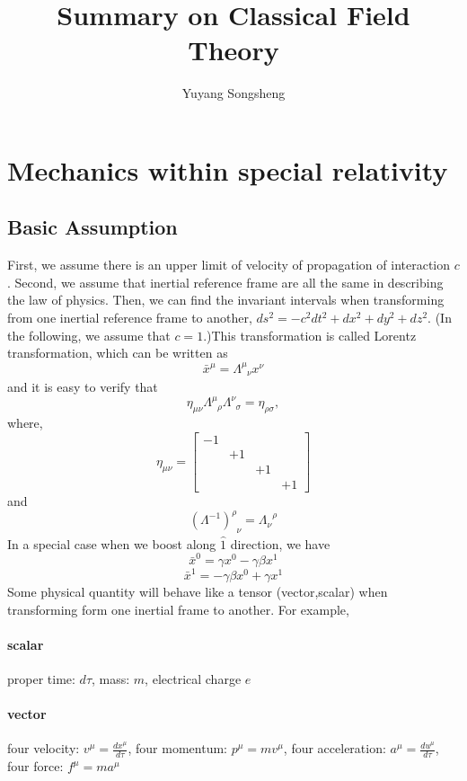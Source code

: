 \documentclass{article}
\author{Yuyang Songsheng}
\title{Summary on Classical Field Theory}
\begin{document}
\maketitle
\section{Mechanics within special relativity}
\subsection{Basic Assumption}
First, we assume there is an upper limit of velocity of propagation of interaction $c$. Second, we assume that inertial reference frame are all the same in describing the law of physics. Then, we can find the invariant intervals when transforming from one inertial reference frame to another, $ds^2 = -c^2 dt^2 + dx^2 + dy^2 + dz^2$. 
(In the following, we assume that $c=1$.)This transformation is called Lorentz transformation, which can be written as
\[\bar{x}^{\mu} = \Lambda^{\mu}_{\phantom{\mu}\nu} x^{\nu}\]
and it is easy to verify that
\[\eta_{\mu \nu} \Lambda^{\mu}_{\phantom{\mu}\rho} \Lambda^{\nu}_{\phantom{\nu}\sigma} = \eta_{\rho \sigma},\]
where,
\[\eta_{\mu \nu} = \left[ 
\begin{matrix} 
-1& & & \\ 
& +1 & & \\
& & +1 & \\
& & & +1
\end{matrix} 
\right]\]
and
\[(\Lambda^{-1})^{\rho}_{\phantom{\rho}\nu} = \Lambda_{\nu}^{\phantom{\mu}\rho}\]
In a special case when we boost along $\hat{1}$ direction, we have
\[\bar{x}^{0} = \gamma x^0 - \gamma \beta x^1\]
\[\bar{x}^{1} = -\gamma \beta x^0 + \gamma x^1\]
Some physical quantity will behave like a tensor (vector,scalar) when transforming form one inertial frame to another. For example,
\paragraph{scalar} proper time: $d \tau$, mass: $m$, electrical charge $e$
\paragraph{vector} four velocity: $v^{\mu} = \frac{dx^{\mu}}{d \tau}$, four momentum: $p^{\mu} = m v^{\mu}$, four acceleration: $a^{\mu} = \frac{du^{\mu}}{d \tau}$, four force: $f^{\mu} = m a^{\mu}$
\end{document}
